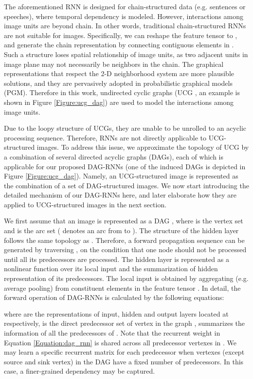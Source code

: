 \documentclass[10pt,twocolumn,letterpaper]{article}
\begin{document}
The aforementioned RNN is designed for chain-structured data (e.g. sentences or speeches), where temporal dependency is modeled. However, interactions among image units are beyond chain. In other words, traditional chain-structured RNNs are not suitable for images. Specifically, we can reshape the feature tensor  to , and generate the chain representation by connecting contiguous elements in . Such a structure loses spatial relationship of image units, as two adjacent units in image plane may not necessarily be neighbors in the chain. The graphical representations that respect the 2-D neighborhood system are more plausible solutions, and they are pervasively adopted in probabilistic graphical models (PGM). Therefore in this work, undirected cyclic graphs (UCG , an example is shown in Figure \ref{Figure:ucg_dag}) are used to model the interactions among image units.





Due to the loopy structure of UCGs, they are unable to be unrolled to an acyclic processing sequence. Therefore, RNNs are not directly applicable to UCG-structured images.
To address this issue, we approximate the topology of UCG by a combination of several directed acyclic graphs (DAGs), each of which is applicable for our proposed DAG-RNNs (one of the induced DAGs is depicted in Figure \ref{Figure:ucg_dag}). Namely, an UCG-structured image is represented as the combination of a set of DAG-structured images.  We now start introducing the detailed mechanism of our DAG-RNNs here, and later elaborate how they are applied to UCG-structured images in the next section.





We first assume that an image  is represented as a DAG , where  is the vertex set and  is the arc set ( denotes an arc from  to ). The structure of the hidden layer  follows the same topology as . Therefore, a forward propagation sequence can be generated by traversing , on the condition that one node should not be processed until all its predecessors are processed.
The hidden layer  is represented as a nonlinear function over its local input  and the summarization of hidden representation of its predecessors. The local input  is obtained by aggregating (e.g. average pooling) from constituent elements in the feature tensor .
In detail, the forward operation of DAG-RNNs is calculated by the following equations:

where  are the representations of input, hidden and output layers located at  respectively,  is the direct predecessor set of vertex  in the graph ,
 summarizes the information of all the predecessors of .
 Note that the recurrent weight  in Equation \ref{Equation:dag_rnn} is shared across all predecessor vertexes in . We may learn a specific recurrent matrix  for each predecessor when vertexes (except source and sink vertex) in the DAG  have a fixed number of predecessors.
In this case,  a finer-grained dependency may be captured.
\end{document}
